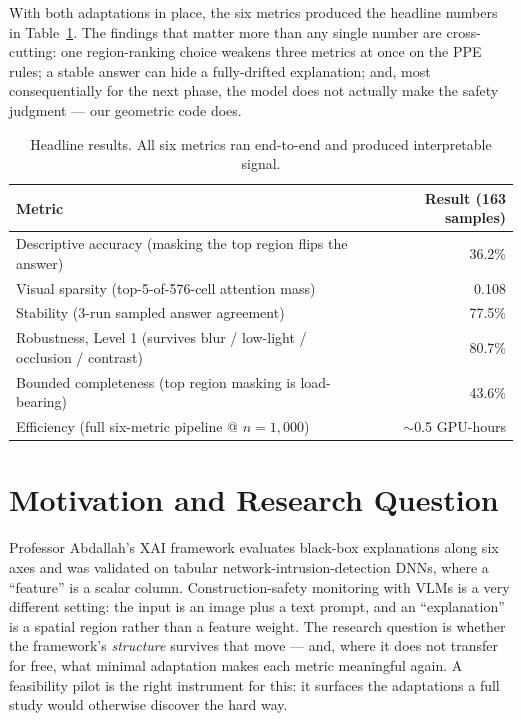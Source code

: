 \documentclass[11pt]{article}
\begin{document}
With both adaptations in place, the six metrics produced the headline numbers in
Table~\ref{tab:headline}. The findings that matter more than any single number are cross-cutting: one
region-ranking choice weakens three metrics at once on the PPE rules; a stable answer can hide a
fully-drifted explanation; and, most consequentially for the next phase, the model does not actually
make the safety judgment --- our geometric code does.

\begin{table}[h]
\centering
\begin{tabular}{lr}
\toprule
\textbf{Metric} & \textbf{Result (163 samples)} \\
\midrule
Descriptive accuracy (masking the top region flips the answer) & 36.2\% \\
Visual sparsity (top-5-of-576-cell attention mass) & 0.108 \\
Stability (3-run sampled answer agreement) & 77.5\% \\
Robustness, Level 1 (survives blur / low-light / occlusion / contrast) & 80.7\% \\
Bounded completeness (top region masking is load-bearing) & 43.6\% \\
Efficiency (full six-metric pipeline @ $n{=}1{,}000$) & $\sim$0.5 GPU-hours \\
\bottomrule
\end{tabular}
\caption{Headline results. All six metrics ran end-to-end and produced interpretable signal.}
\label{tab:headline}
\end{table}

\section{Motivation and Research Question}

Professor Abdallah's XAI framework evaluates black-box explanations along six axes and was validated on
tabular network-intrusion-detection DNNs, where a ``feature'' is a scalar column. Construction-safety
monitoring with VLMs is a very different setting: the input is an image plus a text prompt, and an
``explanation'' is a spatial region rather than a feature weight. The research question is whether the
framework's \emph{structure} survives that move --- and, where it does not transfer for free, what
minimal adaptation makes each metric meaningful again. A feasibility pilot is the right instrument for
this: it surfaces the adaptations a full study would otherwise discover the hard way.
\end{document}
